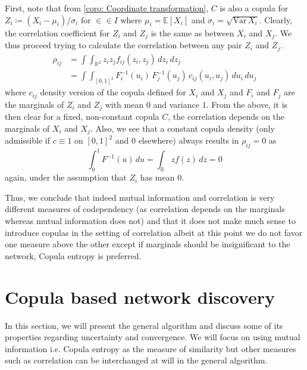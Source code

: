 \documentclass[../Thesis.tex]{subfiles}
\begin{document}
First, note that from \autoref{coro: Coordinate transformation}, $C$ is also a copula for $Z_i \coloneq \left( X_i - \mu_i\right) / \sigma_i$ for $\in \in I$ where $\mu_i = \mathbb{E}[X_i]$ and $\sigma_i = \sqrt{\text{Var} \, X_i}$. Clearly, the correlation coefficient for $Z_i$ and $Z_j$ is the same as between $X_i$ and $X_j$. We thus proceed trying to calculate the correlation between any pair $Z_i$ and $Z_j$.
\begin{align*}
    \rho_{ij} & = \int\int_{\mathbb{R}^2} z_i z_j f_{ij}(z_i,z_j) \, dz_i \, dz_j                       \\
              & = \int\int_{[0,1]^2} F_i^{-1}(u_i) \, F_j^{-1}(u_j) \, c_{ij}(u_i, u_j) \, du_i \, du_j
\end{align*}
where $c_{ij}$ density version of the copula defined for $X_i$ and $X_j$ and $F_i$ and $F_j$ are the marginals of $Z_i$ and $Z_j$ with mean $0$ and variance $1$. From the above, it is then clear for a fixed, non-constant copula $C$, the correlation depends on the marginals of $X_i$ and $X_j$. Also, we see that a constant copula density (only admissible if $c \equiv 1$ on $[0,1]^2$ and $0$ elsewhere) always results in $\rho_{ij} = 0$ as
$$\int_0^1 F^{-1}(u) \, du = \int_{\mathbb{R}} z f(z) \, dz = 0$$
again, under the assumption that $Z_i$ has mean $0$.

Thus, we conclude that indeed mutual information and correlation is very different measures of codependency (as correlation depends on the marginals whereas mutual information does not) and that it does not make much sense to introduce copulas in the setting of correlation albeit at this point we do not favor one measure above the other except if marginals should be insignificant to the network, Copula entropy is preferred.






\section{Copula based network discovery}\label{sec:Copula based network discovery}
In this section, we will present the general algorithm and discuss some of its properties regarding uncertainty and convergence. We will focus on using mutual information i.e. Copula entropy as the measure of similarity but other measures such as correlation can be interchanged at will in the general algorithm.
\end{document}
